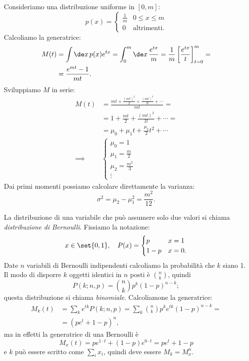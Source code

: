\begin{example}
	Consideriamo una distribuzione uniforme in $[0,m]$:
	\begin{equation*}
		p(x) = \begin{cases}
			\frac 1m & 0 \le x \le m \\
			0  & \text{altrimenti.}
		\end{cases}
	\end{equation*}
	Calcoliamo la generatrice:
	\begin{align*}
		M(t) &= 
		\int \de x\, p(x) e^{tx} =
		\int_0^m \de x\, \frac{e^{tx}}{m} =
		\frac 1m \left[ \frac{e^{tx}}{t} \right]_{t=0}^m = \\
		&= \frac{e^{mt} - 1}{mt}.
	\end{align*}
	Sviluppiamo $M$ in serie:
	\begin{align*}
		M(t) &=
		\frac{mt + \frac{(mt)^2}2 + \frac{(mt)^3}{3!} + \dotsb}{mt} = \\
		&= 1 + \frac{mt}2 + \frac{(mt)^2}{3!} + \dotsb = \\
		&= \mu_0 + \mu_1t + \frac{\mu_2}2t^2 + \dotsb  \\
		\implies &\begin{cases}
			\mu_0 = 1 \\
			\mu_1 = \frac m2 \\
			\mu_2 = \frac{m^2}3 \\
			\vdots
		\end{cases}
	\end{align*}
	Dai primi momenti possiamo calcolare direttamente la varianza:
	\begin{equation*}
		\sigma^2 = \mu_2 - \mu_1^2 = \frac{m^2}{12}.
	\end{equation*}
\end{example}

La distribuzione di una variabile che può assumere solo due valori si chiama \emph{distribuzione di Bernoulli}.
Fissiamo la notazione:
\begin{equation*}
	x \in \set{0,1}, \quad P(x) = \begin{cases}
		p & x = 1 \\
		1-p & x = 0.
	\end{cases}
\end{equation*}
Date $n$ variabili di Bernoulli indipendenti calcoliamo la probabilità che $k$ siano 1.
Il modo di disporre $k$ oggetti identici in $n$ posti è $\binom nk$, quindi
\begin{equation*}
	P(k;n,p) = \binom nk p^{k} (1-p)^{n-k};
\end{equation*}
questa distribuzione si chiama \emph{binomiale}.
Calcoliamone la generatrice:
\begin{align*}
	M_k(t) &=
	\sum_k e^{tk} P(k;n,p) =
	\sum_k \binom nk p^k e^{tk} (1-p)^{n-k} = \\
	&= (pe^t + 1-p)^n,
\end{align*}
ma in effetti la generatrice di una Bernoulli è
\begin{equation*}
	M_x(t) = pe^{1\cdot t} + (1-p)e^{0\cdot t} = pe^t + 1-p
\end{equation*}
e $k$ può essere scritto come $\sum_ix_i$, quindi deve essere $M_k = M_x^n$.

